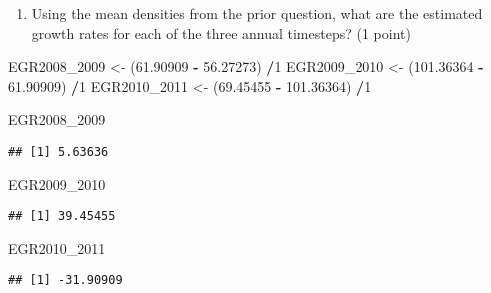 \documentclass[
]{article}
\newenvironment{Shaded}{\begin{snugshade}}{\end{snugshade}}
\newcommand{\DataTypeTok}[1]{\textcolor[rgb]{0.13,0.29,0.53}{#1}}
\newcommand{\DecValTok}[1]{\textcolor[rgb]{0.00,0.00,0.81}{#1}}
\newcommand{\FloatTok}[1]{\textcolor[rgb]{0.00,0.00,0.81}{#1}}
\newcommand{\KeywordTok}[1]{\textcolor[rgb]{0.13,0.29,0.53}{\textbf{#1}}}
\newcommand{\NormalTok}[1]{#1}
\newcommand{\OperatorTok}[1]{\textcolor[rgb]{0.81,0.36,0.00}{\textbf{#1}}}
\newcommand{\StringTok}[1]{\textcolor[rgb]{0.31,0.60,0.02}{#1}}
\providecommand{\tightlist}{%
  \setlength{\itemsep}{0pt}\setlength{\parskip}{0pt}}
\begin{document}
\begin{enumerate}
\def\labelenumi{\arabic{enumi}.}
\setcounter{enumi}{2}
\tightlist
\item
  Using the mean densities from the prior question, what are the
  estimated growth rates for each of the three annual timesteps? (1
  point)
\end{enumerate}

\begin{Shaded}
\begin{Highlighting}[]
\NormalTok{EGR2008_}\DecValTok{2009}\NormalTok{ <-}\StringTok{ }\NormalTok{(}\FloatTok{61.90909} \OperatorTok{-}\StringTok{ }\FloatTok{56.27273}\NormalTok{) }\OperatorTok{/}\DecValTok{1}
\NormalTok{EGR2009_}\DecValTok{2010}\NormalTok{ <-}\StringTok{ }\NormalTok{(}\FloatTok{101.36364} \OperatorTok{-}\StringTok{ }\FloatTok{61.90909}\NormalTok{) }\OperatorTok{/}\DecValTok{1}
\NormalTok{EGR2010_}\DecValTok{2011}\NormalTok{ <-}\StringTok{ }\NormalTok{(}\FloatTok{69.45455} \OperatorTok{-}\StringTok{ }\FloatTok{101.36364}\NormalTok{) }\OperatorTok{/}\DecValTok{1}
  
\NormalTok{EGR2008_}\DecValTok{2009}
\end{Highlighting}
\end{Shaded}

\begin{verbatim}
## [1] 5.63636
\end{verbatim}

\begin{Shaded}
\begin{Highlighting}[]
\NormalTok{EGR2009_}\DecValTok{2010}
\end{Highlighting}
\end{Shaded}

\begin{verbatim}
## [1] 39.45455
\end{verbatim}

\begin{Shaded}
\begin{Highlighting}[]
\NormalTok{EGR2010_}\DecValTok{2011}
\end{Highlighting}
\end{Shaded}

\begin{verbatim}
## [1] -31.90909
\end{verbatim}

\begin{Shaded}
\end{Shaded}
\end{document}
